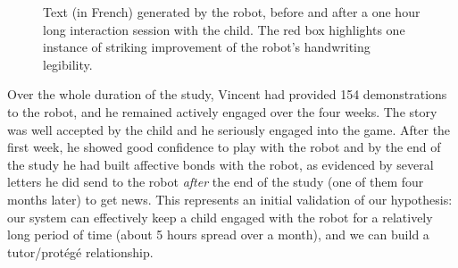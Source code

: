 \documentclass{article}
\begin{document}
\begin{figure}
    \centering

    \caption{\small Text (in French) generated by the robot, before and after a one
        hour long interaction session with the child. The red box
        highlights one instance of striking improvement of the robot's
        handwriting legibility.}

    \label{fig:stimuli}
\end{figure}

Over the whole duration of the study, Vincent had provided 154 demonstrations to
the robot, and he remained actively engaged over the four weeks. The story was
well accepted by the child and he seriously engaged into the game. After the
first week, he showed good confidence to play with the robot and by the end of
the study he had built affective bonds with the robot, as evidenced by several
letters he did send to the robot \emph{after} the end of the study (one of them
four months later) to get news. This represents an initial validation of our
hypothesis: our system can effectively keep a child engaged with the robot for a
relatively long period of time (about 5 hours spread over a month), and we can
build a tutor/protégé relationship.
\end{document}
